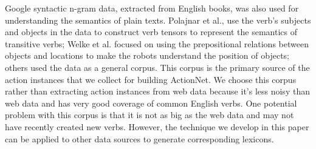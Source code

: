 Google syntactic n-gram data, extracted from English books,
was also used for understanding the semantics of plain texts.
Polajnar et al.\cite{polajnar2013learning}, use the
verb's subjects and objects in the data
to construct verb tensors to represent the semantics
of transitive verbs; Welke et al.\cite{welkegrounded} focused
on using the prepositional relations between objects and locations
to make the robots understand the position of objects; others
\cite{borin2013mining,riedlscaling,kaiserextracting}
used the data as a general corpus.
This corpus is the primary source of the action instances
that we collect for building ActionNet. We choose this 
corpus rather than extracting action instances from web data 
because it's less noisy than web data and has very good 
coverage of common English verbs. One potential problem 
with this corpus is that it is not as big as the web data 
and may not have recently created new verbs.
However, the technique we develop in this paper can be 
applied to other data sources to generate corresponding 
lexicons.
%
